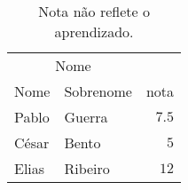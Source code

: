 \begin{table}
\begin{center}
\begin{tabular}{llr}
\toprule
\multicolumn{2}{c}{Nome} \\
\cmidrule(r){1-2}
Nome & Sobrenome & nota \\
\midrule
Pablo & Guerra & $7.5$ \\
César & Bento & $5$ \\
Elias & Ribeiro & $12$ \\
\bottomrule
\end{tabular}
\caption{Nota não reflete o aprendizado.}%
\label{tab:notas}
\end{center}
\end{table}
